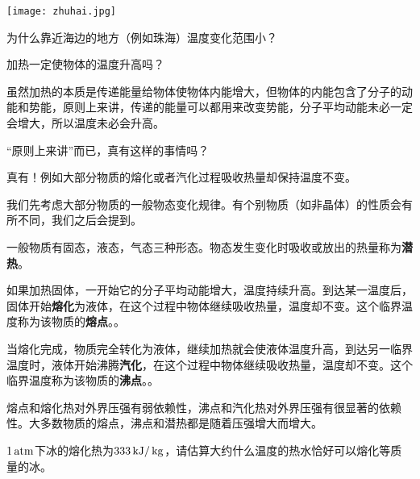 \documentclass[CJK]{beamer}
\begin{document}
\begin{frame}
\bch
\bcenter
\texttt{[image: zhuhai.jpg]}
\ecenter

为什么靠近海边的地方（例如珠海）温度变化范围小？
\ech
\end{frame}


\begin{frame}
\bch
加热一定使物体的温度升高吗？
\ech
\end{frame}


\begin{frame}
\bch
\bitem
\item{虽然加热的本质是传递能量给物体使物体内能增大，但物体的内能包含了分子的动能和势能，原则上来讲，传递的能量可以都用来改变势能，分子平均动能未必一定会增大，所以温度未必会升高。}
\eitem

\skipline

“原则上来讲”而已，真有这样的事情吗？

\skipline

真有！例如大部分物质的熔化或者汽化过程吸收热量却保持温度不变。

\ech
\end{frame}


\begin{frame}
\bch
{\small 我们先考虑大部分物质的一般物态变化规律。有个别物质（如非晶体）的性质会有所不同，我们之后会提到。

\bitem
\item{一般物质有固态，液态，气态三种形态。物态发生变化时吸收或放出的热量称为{\bf 潜热}。}
\item{如果加热固体，一开始它的分子平均动能增大，温度持续升高。到达某一温度后，固体开始{\bf 熔化}为液体，在这个过程中物体继续吸收热量，温度却不变。这个临界温度称为该物质的{\bf 熔点}。{}。}
\item{当熔化完成，物质完全转化为液体，继续加热就会使液体温度升高，到达另一临界温度时，液体开始沸腾{\bf 汽化}，在这个过程中物体继续吸收热量，温度却不变。这个临界温度称为该物质的{\bf 沸点}。{}。}
\item{ 熔点和熔化热对外界压强有弱依赖性，沸点和汽化热对外界压强有很显著的依赖性。大多数物质的熔点，沸点和潜热都是随着压强增大而增大。}
\eitem}
\ech
\end{frame}

\begin{frame}
\bch
$1\,\mathrm{atm}$下冰的熔化热为$333 \,\mathrm{kJ}/\,\mathrm{kg}$，请估算大约什么温度的热水恰好可以熔化等质量的冰。
\ech
\end{frame}
\end{document}
